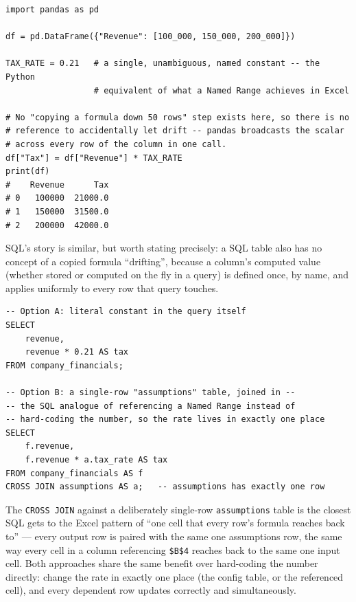 \documentclass[11pt,a4paper]{article}
\begin{document}
\begin{lstlisting}[style=pythonstyle, caption={The "always reference one fixed value" pattern, done the Python way -- a scalar constant, referenced once, broadcast automatically}]
import pandas as pd

df = pd.DataFrame({"Revenue": [100_000, 150_000, 200_000]})

TAX_RATE = 0.21   # a single, unambiguous, named constant -- the Python
                  # equivalent of what a Named Range achieves in Excel

# No "copying a formula down 50 rows" step exists here, so there is no
# reference to accidentally let drift -- pandas broadcasts the scalar
# across every row of the column in one call.
df["Tax"] = df["Revenue"] * TAX_RATE
print(df)
#    Revenue      Tax
# 0   100000  21000.0
# 1   150000  31500.0
# 2   200000  42000.0
\end{lstlisting}

SQL's story is similar, but worth stating precisely: a SQL table also has no concept of a copied formula ``drifting'', because a column's computed value (whether stored or computed on the fly in a query) is defined once, by name, and applies uniformly to every row that query touches.

\begin{lstlisting}[style=sqlstyle, caption={The same fixed-rate calculation in SQL -- a literal constant applied uniformly, or joined from a single-row config table}]
-- Option A: literal constant in the query itself
SELECT
    revenue,
    revenue * 0.21 AS tax
FROM company_financials;

-- Option B: a single-row "assumptions" table, joined in --
-- the SQL analogue of referencing a Named Range instead of
-- hard-coding the number, so the rate lives in exactly one place
SELECT
    f.revenue,
    f.revenue * a.tax_rate AS tax
FROM company_financials AS f
CROSS JOIN assumptions AS a;   -- assumptions has exactly one row
\end{lstlisting}

\begin{keyconcept}
The \texttt{CROSS JOIN} against a deliberately single-row \texttt{assumptions} table is the closest SQL gets to the Excel pattern of ``one cell that every row's formula reaches back to'' --- every output row is paired with the same one assumptions row, the same way every cell in a column referencing \texttt{\$B\$4} reaches back to the same one input cell. Both approaches share the same benefit over hard-coding the number directly: change the rate in exactly one place (the config table, or the referenced cell), and every dependent row updates correctly and simultaneously.
\end{keyconcept}
\end{document}
